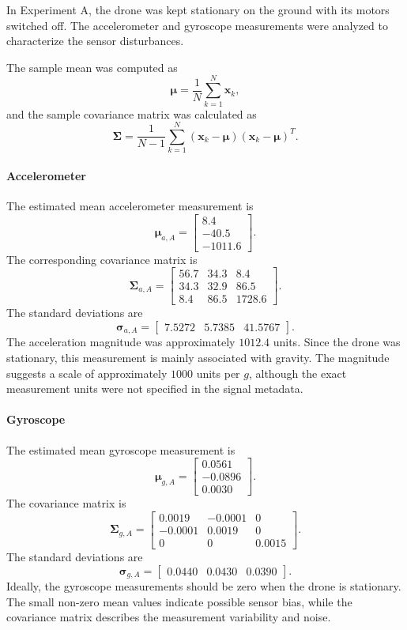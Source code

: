 \documentclass[10pt,a4paper]{article}
\newenvironment{answer}{%
  \begin{tcolorbox}[breakable,enhanced,colback=white,colframe=greyline,
    boxrule=0.6pt,arc=2pt,left=8pt,right=8pt,top=7pt,bottom=7pt,
    before skip=0pt,after skip=12pt]
}{\end{tcolorbox}}
\begin{document}
\begin{answer}
In Experiment A, the drone was kept stationary on the ground
with its motors switched off. The accelerometer and gyroscope
measurements were analyzed to characterize the sensor disturbances.

The sample mean was computed as
\[
\boldsymbol{\mu} =
\frac{1}{N}\sum_{k=1}^{N}\mathbf{x}_k,
\]
and the sample covariance matrix was calculated as
\[
\boldsymbol{\Sigma} =
\frac{1}{N-1}
\sum_{k=1}^{N}
(\mathbf{x}_k-\boldsymbol{\mu})
(\mathbf{x}_k-\boldsymbol{\mu})^T.
\]

\paragraph{Accelerometer}
The estimated mean accelerometer measurement is
\[
\boldsymbol{\mu}_{a,A} =
\begin{bmatrix}
8.4\\
-40.5\\
-1011.6
\end{bmatrix}.
\]
The corresponding covariance matrix is
\[
\boldsymbol{\Sigma}_{a,A} =
\begin{bmatrix}
56.7 & 34.3 & 8.4\\
34.3 & 32.9 & 86.5\\
8.4 & 86.5 & 1728.6
\end{bmatrix}.
\]
The standard deviations are
\[
\boldsymbol{\sigma}_{a,A} =
\begin{bmatrix}
7.5272 & 5.7385 & 41.5767
\end{bmatrix}.
\]
The acceleration magnitude was approximately \(1012.4\)
units. Since the drone was stationary, this measurement is
mainly associated with gravity. The magnitude suggests a
scale of approximately \(1000\) units per \(g\), although
the exact measurement units were not specified in the
signal metadata.

\paragraph{Gyroscope}
The estimated mean gyroscope measurement is
\[
\boldsymbol{\mu}_{g,A} =
\begin{bmatrix}
0.0561\\
-0.0896\\
0.0030
\end{bmatrix}.
\]
The covariance matrix is
\[
\boldsymbol{\Sigma}_{g,A} =
\begin{bmatrix}
0.0019 & -0.0001 & 0\\
-0.0001 & 0.0019 & 0\\
0 & 0 & 0.0015
\end{bmatrix}.
\]
The standard deviations are
\[
\boldsymbol{\sigma}_{g,A} =
\begin{bmatrix}
0.0440 & 0.0430 & 0.0390
\end{bmatrix}.
\]
Ideally, the gyroscope measurements should be zero when
the drone is stationary. The small non-zero mean values
indicate possible sensor bias, while the covariance matrix
describes the measurement variability and noise.


\end{answer}
\end{document}
